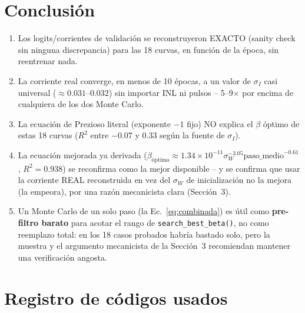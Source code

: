 \documentclass[11pt]{article}
\begin{document}
\section{Conclusión}

\begin{enumerate}
\item Los logits/corrientes de validación se reconstruyeron EXACTO
  (sanity check sin ninguna discrepancia) para las 18 curvas, en función
  de la época, sin reentrenar nada.
\item La corriente real converge, en menos de 10 épocas, a un valor de
  $\sigma_I$ casi universal ($\approx0.031$--$0.032$) sin importar INL ni
  pulsos -- 5--9$\times$ por encima de cualquiera de los dos Monte Carlo.
\item La ecuación de Prezioso literal (exponente $-1$ fijo) NO explica el
  $\beta$ óptimo de estas 18 curvas ($R^2$ entre $-0.07$ y $0.33$ según la
  fuente de $\sigma_I$).
\item La ecuación mejorada ya derivada
  ($\beta_{\text{óptimo}}\approx1.34\times10^{-11}\sigma_W^{-3.05}\mathrm{paso\_medio}^{-0.61}$,
  $R^2=0.938$) se reconfirma como la mejor disponible -- y se confirma que
  usar la corriente REAL reconstruida en vez del $\sigma_W$ de
  inicialización no la mejora (la empeora), por una razón mecanicista
  clara (Sección~3).
\item Un Monte Carlo de un solo paso (la Ec.~\ref{eq:combinada}) es útil
  como \textbf{pre-filtro barato} para acotar el rango de
  \texttt{search\_best\_beta()}, no como reemplazo total: en los 18 casos
  probados habría bastado solo, pero la muestra y el argumento mecanicista
  de la Sección~3 recomiendan mantener una verificación angosta.
\end{enumerate}

\section{Registro de códigos usados}
\end{document}
